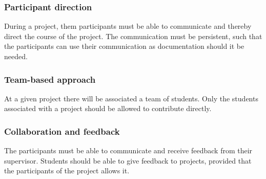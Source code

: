 \subsubsection{Participant direction}
During a project, them participants must be able to communicate and thereby direct the course of the project.
The communication must be persistent, such that the participants can use their communication as documentation should it be needed.

\subsubsection{Team-based approach}
At a given project there will be associated a team of students.
Only the students associated with a project should be allowed to contribute directly.

\subsubsection{Collaboration and feedback}
The participants must be able to communicate and receive feedback from their supervisor.
Students should be able to give feedback to projects, provided that the participants of the project allows it.











